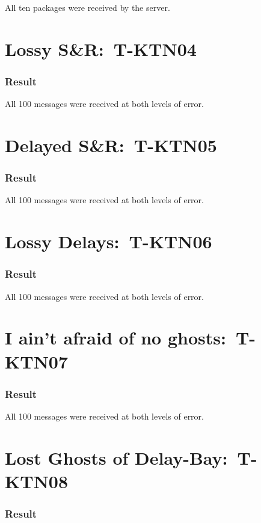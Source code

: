 \documentclass{article}
\begin{document}
All ten packages were received by the server.

\section{Lossy S\&R:\ T-KTN04}

\subsubsection{Result}

All 100 messages were received at both levels of error.

\section{Delayed S\&R:\ T-KTN05}

\subsubsection{Result}

All 100 messages were received at both levels of error.

\section{Lossy Delays:\ T-KTN06}

\subsubsection{Result}

All 100 messages were received at both levels of error.

\section{I ain't afraid of no ghosts:\ T-KTN07}

\subsubsection{Result}

All 100 messages were received at both levels of error.

\section{Lost Ghosts of Delay-Bay:\ T-KTN08}

\subsubsection{Result}
\end{document}
